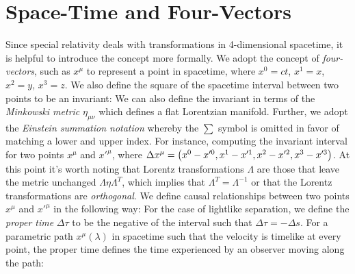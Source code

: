 \section{Space-Time and Four-Vectors}
Since special relativity deals with transformations in 4-dimensional spacetime, it is helpful to introduce the concept more formally. We adopt the concept of \textit{four-vectors}, such as $x^\mu$ to represent a point in spacetime, where $x^0=ct$, $x^1=x$, $x^2=y$, $x^3=z$. We also define the square of the spacetime interval between two points to be an invariant:
We can also define the invariant in terms of the \textit{Minkowski metric} $\eta_{\mu\nu}$ which defines a flat Lorentzian manifold. Further, we adopt the \textit{Einstein summation notation} whereby the $\sum$ symbol is omitted in favor of matching a lower and upper index. For instance, computing the invariant interval for two points $x^\mu$ and $x'^\mu$, where $\Delta x^\mu = \left(x^0-x'^0, x^1-x'^1, x^2-x'^2, x^3-x'^3\right)$.
At this point it's worth noting that Lorentz transformations $\Lambda$ are those that leave the metric unchanged $\Lambda \eta \Lambda^{T}$, which implies that $\Lambda^T = \Lambda^{-1}$ or that the Lorentz transformations are \textit{orthogonal}. We define causal relationships between two points $x^\mu$ and $x'^\mu$ in the following way:
For the case of lightlike separation, we define the \textit{proper time} $\Delta \tau$ to be the negative of the interval such that $\Delta \tau = - \Delta s$. For a parametric path $x^\mu(\lambda)$ in spacetime such that the velocity is timelike at every point, the proper time defines the time experienced by an observer moving along the path:

